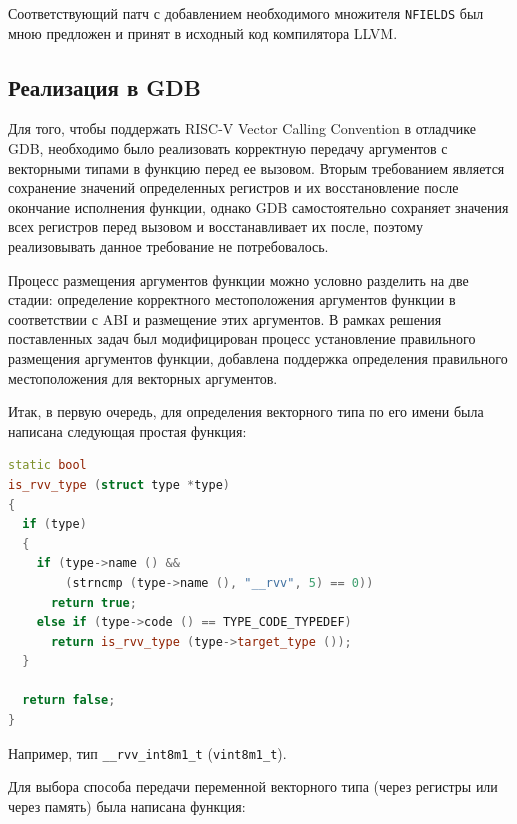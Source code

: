 Соответствующий патч с добавлением необходимого множителя \texttt{NFIELDS} был
мною предложен и принят в исходный код компилятора LLVM.

\subsection {Реализация в GDB}
\label{work:realisation}

Для того, чтобы поддержать RISC-V Vector Calling Convention в отладчике GDB, необходимо
было реализовать корректную передачу аргументов с векторными типами в функцию перед ее вызовом. 
Вторым требованием
является сохранение значений определенных регистров и их восстановление после окончание
исполнения функции, однако GDB самостоятельно сохраняет значения всех регистров перед вызовом
и восстанавливает их после, поэтому реализовывать данное требование не потребовалось.

Процесс размещения аргументов функции можно условно разделить на две стадии: определение корректного
местоположения аргументов функции в соответствии с ABI и размещение этих аргументов. В рамках
решения поставленных задач был модифицирован процесс установление правильного размещения
аргументов функции, добавлена поддержка определения правильного местоположения для векторных
аргументов.

Итак, в первую очередь, для определения векторного типа по его имени была написана следующая простая функция:

\begin{samepage}
\begin{lstlisting}[language=C++, caption=Функция для определения векторных типов, label=lst:func:is_rvv_type]
static bool
is_rvv_type (struct type *type)
{
  if (type)
  {
    if (type->name () && 
        (strncmp (type->name (), "__rvv", 5) == 0))
      return true;
    else if (type->code () == TYPE_CODE_TYPEDEF)
      return is_rvv_type (type->target_type ());
  }

  return false;
}
\end{lstlisting}
\end{samepage}

Например, тип \texttt{\_\_rvv\_int8m1\_t} (\texttt{vint8m1\_t}).

Для выбора способа передачи переменной векторного типа (через регистры или через память) была написана функция:

